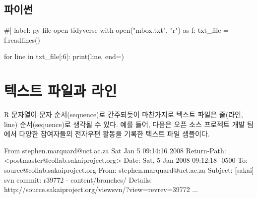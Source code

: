 \documentclass[
  letterpaper,
]{book}
\newenvironment{Shaded}{\begin{snugshade}}{\end{snugshade}}
\newcommand{\DecValTok}[1]{\textcolor[rgb]{0.68,0.00,0.00}{#1}}
\newcommand{\ErrorTok}[1]{\textcolor[rgb]{0.68,0.00,0.00}{#1}}
\newcommand{\NormalTok}[1]{\textcolor[rgb]{0.00,0.23,0.31}{#1}}
\newcommand{\OtherTok}[1]{\textcolor[rgb]{0.00,0.23,0.31}{#1}}
\newcommand{\SpecialCharTok}[1]{\textcolor[rgb]{0.37,0.37,0.37}{#1}}
\begin{document}
\subsection{파이썬}

\begin{Shaded}
\begin{Highlighting}[]
\NormalTok{\#| label: py{-}file{-}open{-}tidyverse}
\NormalTok{with open("mbox.txt", "r") as f:}
\NormalTok{    txt\_file = f.readlines()}

\NormalTok{for line in txt\_file[:6]:}
\NormalTok{    print(line, end=\textquotesingle{}\textquotesingle{})}
\end{Highlighting}
\end{Shaded}

\section{텍스트 파일과 라인}\label{r-file-txt}

R 문자열이 문자 순서(sequence)로 간주되듯이 마찬가지로 텍스트 파일은
줄(라인, line) 순서(sequence)로 생각될 수 있다. 예를 들어, 다음은 오픈
소스 프로젝트 개발 팀에서 다양한 참여자들의 전자우편 활동을 기록한
텍스트 파일 샘플이다.

\begin{Shaded}
\begin{Highlighting}[]
\NormalTok{From stephen.marquard}\SpecialCharTok{@}\NormalTok{uct.ac.za Sat Jan  }\DecValTok{5} \DecValTok{09}\SpecialCharTok{:}\DecValTok{14}\SpecialCharTok{:}\DecValTok{16} \DecValTok{2008}
\NormalTok{Return}\SpecialCharTok{{-}}\NormalTok{Path}\SpecialCharTok{:} \ErrorTok{\textless{}}\NormalTok{postmaster}\SpecialCharTok{@}\NormalTok{collab.sakaiproject.org}\SpecialCharTok{\textgreater{}}
\NormalTok{Date}\SpecialCharTok{:}\NormalTok{ Sat, }\DecValTok{5}\NormalTok{ Jan }\DecValTok{2008} \DecValTok{09}\SpecialCharTok{:}\DecValTok{12}\SpecialCharTok{:}\DecValTok{18} \SpecialCharTok{{-}}\DecValTok{0500}
\NormalTok{To}\SpecialCharTok{:}\NormalTok{ source}\SpecialCharTok{@}\NormalTok{collab.sakaiproject.org}
\NormalTok{From}\SpecialCharTok{:}\NormalTok{ stephen.marquard}\SpecialCharTok{@}\NormalTok{uct.ac.za}
\NormalTok{Subject}\SpecialCharTok{:}\NormalTok{ [sakai] svn commit}\SpecialCharTok{:}\NormalTok{ r39772 }\SpecialCharTok{{-}}\NormalTok{ content}\SpecialCharTok{/}\NormalTok{branches}\SpecialCharTok{/}
\NormalTok{Details}\SpecialCharTok{:}\NormalTok{ http}\SpecialCharTok{:}\ErrorTok{//}\NormalTok{source.sakaiproject.org}\SpecialCharTok{/}\NormalTok{viewsvn}\SpecialCharTok{/}\NormalTok{?view}\OtherTok{=}\NormalTok{revrev}\OtherTok{=}\DecValTok{39772}
\NormalTok{...}
\end{Highlighting}
\end{Shaded}
\end{document}
